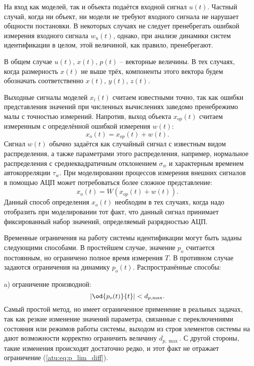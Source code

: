 На вход как моделей, так и объекта подаётся входной сигнал \label{atu:d:u}$u(t)$.
Частный случай, когда ни объект, ни модели не требуют входного сигнала
не нарушает общности постановки. В некоторых случаях
не следует пренебрегать ошибкой измерения входного сигнала $w_u(t)$,
однако, при анализе динамики систем идентификации в целом,
этой величиной, как правило, пренебрегают.

В общем случае $u(t)$, $x(t)$, $p(t)$ -- векторные величины.
В тех случаях, когда размерность $x(t)$ не выше трёх,
компоненты этого вектора будем обозначать соответственно $x(t)$, $y(t)$, $z(t)$.

Выходные сигналы моделей
\label{atu:d:x}$x_i(t)$ считаем известными точно, так как ошибки
представления значений при численных вычислениях заведомо
пренебрежимо малы с точностью измерений. Напротив,
выход объекта $x_{op}(t)$ считаем измеренным
с определённой ошибкой измерения \label{atu:d:w}$w(t)$:
%
\[
  x_o(t) = x_{op}(t) + w(t).
\]
%
Сигнал $w(t)$ обычно задаётся как случайный сигнал с
известным видом распределения, а также параметрами этого распределения,
например, нормальное распределения с среднеквадратичным отклонением $\sigma_w$
и характерным временем автокорреляции $\tau_w$.
При моделировании процессов измерения внешних сигналов в помощью АЦП может потребоваться
более сложное представление:
%
\[
  x_o(t) = W( x_{op}(t) + w(t) ).
\]
%
Данный способ определения $x_o(t)$ необходим в тех случаях,
когда надо отобразить при моделировании тот факт,
что данный сигнал принимает фиксированный набор значений, определяемый разрядностью АЦП.

Временные ограничения на работу системы идентификации могут быть заданы
следующими способами. В простейшем случае, значение $p_o$
считается постоянным, но ограничено полное время измерения $T$.
В противном случае задаются ограничения на динамику $p_o(t)$.
Распространённые способы:

a) ограничение производной:
%
\begin{equation}
  \left| \od{p_o(t)}{t} \right| < d_{p,\max}.
  \label{atu:eq:p_lim_diff}
\end{equation}
Самый простой метод, но имеет ограниченное применение в реальных
задачах, так как резкие изменение значений параметра,
связанные с переключениями состояния или режимов работы системы,
выходом из строя элементов системы на дают возможности корректно ограничить
величину  $d_{p,\max}$. С другой стороны, такие изменения
происходят достаточно редко, и этот факт не отражает ограничение (\ref{atu:eq:p_lim_diff}).


